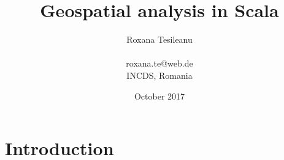 \documentclass {article}
\title {Geospatial analysis in Scala}
\date {October 2017}
\author {Roxana Tesileanu \\
\\
roxana.te@web.de \\
INCDS, Romania}
\begin{document}
	\maketitle

\tableofcontents

\section {Introduction}
\end{document}
